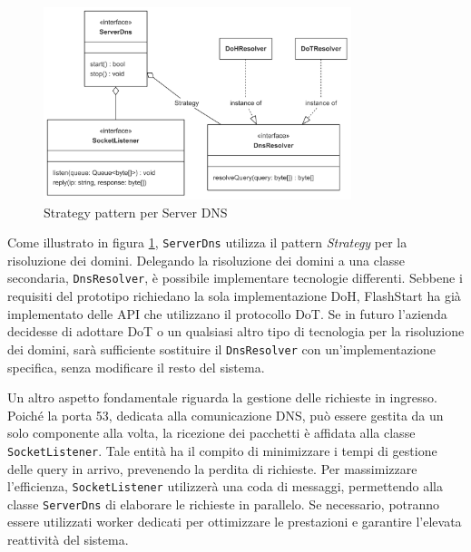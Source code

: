 \documentclass[12pt,a4paper,openright,twoside]{book}
\begin{document}
\begin{figure}[H]
	\centering
	\includegraphics[width=0.8\textwidth]{figures/dns-strategy-pattern.png}
	\caption{Strategy pattern per Server DNS}
	\label{fig:dns-strategy-pattern}
\end{figure}
Come illustrato in figura \ref{fig:dns-strategy-pattern}, \texttt{ServerDns} utilizza il pattern \textit{Strategy} per la risoluzione dei domini.
Delegando la risoluzione dei domini a una classe secondaria, \texttt{DnsResolver}, è possibile implementare tecnologie differenti.
Sebbene i requisiti del prototipo richiedano la sola implementazione \gls{DoH}, FlashStart ha già implementato delle API che utilizzano il protocollo \gls{DoT}.
Se in futuro l'azienda decidesse di adottare \gls{DoT} o un qualsiasi altro tipo di tecnologia per la risoluzione dei domini, sarà sufficiente sostituire il \texttt{DnsResolver} con un'implementazione specifica, senza modificare il resto del sistema.


Un altro aspetto fondamentale riguarda la gestione delle richieste in ingresso.  
Poiché la porta 53, dedicata alla comunicazione \gls{DNS}, può essere gestita da un solo componente alla volta, la ricezione dei pacchetti è affidata alla classe \texttt{SocketListener}. 
Tale entità ha il compito di minimizzare i tempi di gestione delle query in arrivo, prevenendo la perdita di richieste.
Per massimizzare l'efficienza, \texttt{SocketListener} utilizzerà una coda di messaggi, permettendo alla classe \texttt{ServerDns} di elaborare le richieste in parallelo.
Se necessario, potranno essere utilizzati worker dedicati per ottimizzare le prestazioni e garantire l'elevata reattività del sistema.
\end{document}
